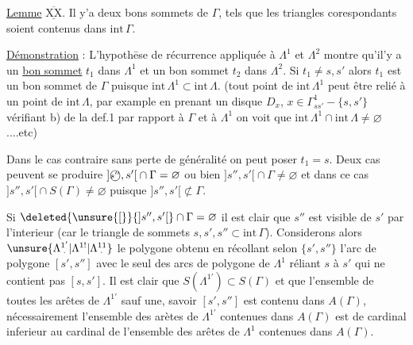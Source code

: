 \uline{Lemme} $\overline{\underline{\mathrm{XX}}}$. Il y'a deux bons sommets de $\Gamma$,   tels que les  triangles corespondants soient contenus dans $\mathrm{int}\,\Gamma$.

\uline{Démonstration} : L'hypothēse de récurrence appliquée à $\Lambda^1$ et $\Lambda^2$ montre qu'il'y a un \uline{bon sommet} %
$t_1$ dans $\Lambda^1$ et un bon sommet $t_2$ dans $\Lambda^2$. Si $t_1\ne s,s'$ alors $t_1$ est un bon sommet de $\Gamma$ puisque $\mathrm{int}\,\Lambda^1\subset\mathrm{int}\,\Lambda$. (tout point de $\mathrm{int}\,\Lambda^1$ peut être relié à un point de $\mathrm{int}\,\Lambda$, par example en prenant un disque $D_x$, $x\in\Gamma^{1}_{ss'}-\{s,s'\}$ vérifiant b) de la def.1 par rapport à $\Gamma$ et à $\Lambda^1$ on voit que $\mathrm{int}\,\Lambda^1\cap\mathrm{int}\,\Lambda\ne\varnothing$....etc)

Dans le cas contraire sans perte de généralité on peut poser $t_1=s$. Deux cas peuvent se produire $ {]\text{\textcircled{\scriptsize \(s''\)}},s'[}\cap\Gamma=\varnothing$ ou bien $ {]s'',s'[}\cap\Gamma\ne\varnothing$ et dans ce cas $ {]s'',s'[}\cap S(\Gamma)\ne\varnothing$ puisque $ {]s'',s'[}\not\subset\Gamma$.

Si $\deleted{\unsure{[}}{]s'',s'[}\cap\Gamma=\varnothing$ il est clair que $s''$ est visible de $s'$ par l'interieur (car le triangle de sommets $s,s',s''\subset\mathrm{int}\,\Gamma$). Considerons alors $\unsure{\Lambda^{1'}_{\mkern5mu\cdot}|\Lambda^{1!}|\Lambda^{11}_{\mkern5mu\cdot}}$ le polygone \margin{!}obtenu en récollant selon  $\{s',s''\}$ l'arc de polygone $[s',s'']$ avec le seul des arcs de polygone de $\Lambda^1$ réliant $s$ à $s'$ qui ne contient pas $[s,s']$. Il est clair que $S(\Lambda^{1'})\subset S(\Gamma)$ et que l'ensemble de toutes les arêtes de $\Lambda^{1'}$ sauf une, savoir $[s',s'']$ est contenu dans $A(\Gamma)$,  nécessairement l'ensemble des arètes de $\Lambda^{1'}$ contenues dans $A(\Gamma)$ est de cardinal inferieur  %
au cardinal de l'ensemble des arêtes de $\Lambda^1$ contenues dans $A(\Gamma)$.

